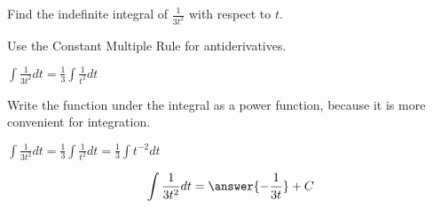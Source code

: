 \documentclass{ximera}
\author{Gregory Hartman \and Matthew Carr\and Nela Lakos}
\begin{document}
\begin{exercise}


Find the indefinite integral of $\frac{1}{3t^2}$ with respect to $t$.
\begin{hint}
Use the Constant Multiple Rule for antiderivatives.

$\int\frac{1}{3t^2} dt=\frac{1}{3}\int\frac{1}{t^2} dt$
 \end{hint}
\begin{hint}
Write the  function under the integral as a power function, because it is more convenient for integration.

$\int\frac{1}{3t^2} dt=\frac{1}{3}\int\frac{1}{t^2} dt=\frac{1}{3}\int t^{-2} dt$
\end{hint}
\[
\int \frac{1}{3t^2} dt=\answer{-\frac{1}{3t}}+C
\]


\end{exercise}
\end{document}
